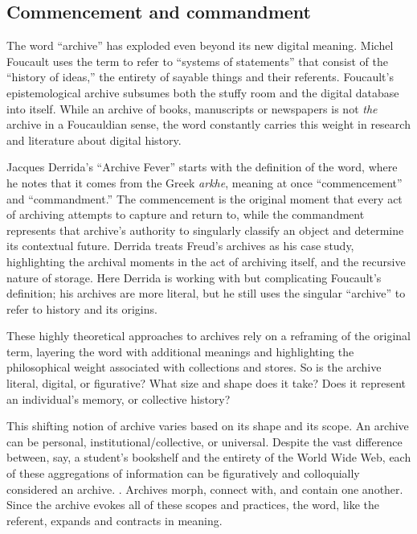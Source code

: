 \subsection{Commencement and commandment}

The word ``archive'' has exploded even beyond its new digital meaning. Michel Foucault uses the term to refer to ``systems of statements'' that consist of the ``history of ideas,'' the entirety of sayable things and their referents.  Foucault's epistemological archive subsumes both the stuffy room and the digital database into itself. While an archive of books, manuscripts or newspapers is not \emph{the} archive in a Foucauldian sense, the word constantly carries this weight in research and literature about digital history.

Jacques Derrida's ``Archive Fever'' starts with the definition of the word, where he notes that it comes from the Greek \emph{arkhe}, meaning at once ``commencement'' and ``commandment.'' The commencement is the original moment that every act of archiving attempts to capture and return to, while the commandment represents that archive's authority to singularly classify an object and determine its contextual future. Derrida treats Freud's archives as his case study, highlighting the archival moments in the act of archiving itself, and the recursive nature of storage. Here Derrida is working with but complicating Foucault's definition; his archives are more literal, but he still uses the singular ``archive'' to refer to history and its origins.

These highly theoretical approaches to archives rely on a reframing of the original term, layering the word with additional meanings and highlighting the philosophical weight associated with collections and stores. So is the archive literal, digital, or figurative? What size and shape does it take? Does it represent an individual's memory, or collective history?

This shifting notion of archive varies based on its shape and its scope. An archive can be personal, institutional/collective, or universal. Despite the vast difference between, say, a student's bookshelf and the entirety of the World Wide Web, each of these aggregations of information can be figuratively and colloquially considered an archive. . Archives morph, connect with, and contain one another. Since the archive evokes all of these scopes and practices, the word, like the referent, expands and contracts in meaning.

